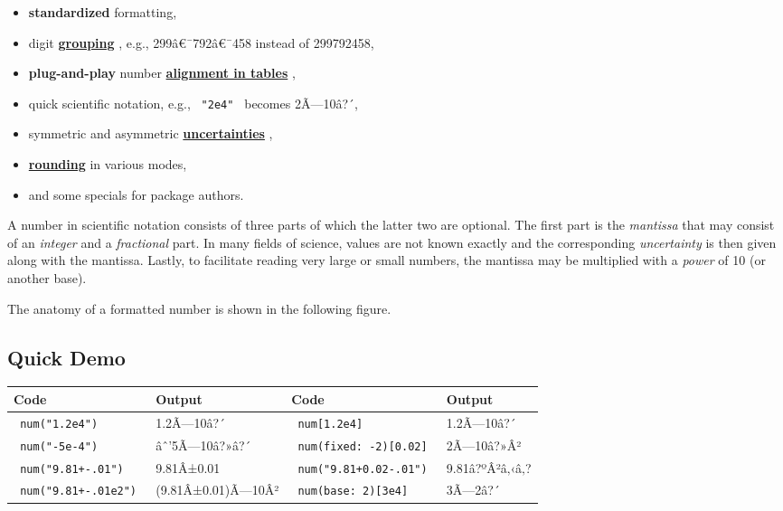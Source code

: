 \begin{itemize}
\tightlist
\item
  \textbf{standardized} formatting,
\item
  digit
  \href{https://github.com/typst/packages/raw/main/packages/preview/zero/0.3.0/\#grouping}{\textbf{grouping}}
  , e.g., 299â€¯792â€¯458 instead of 299792458,
\item
  \textbf{plug-and-play} number
  \href{https://github.com/typst/packages/raw/main/packages/preview/zero/0.3.0/\#table-alignment}{\textbf{alignment
  in tables}} ,
\item
  quick scientific notation, e.g., \texttt{\ "2e4"\ } becomes
  2Ã---10â?´,
\item
  symmetric and asymmetric
  \href{https://github.com/typst/packages/raw/main/packages/preview/zero/0.3.0/\#specifying-uncertainties}{\textbf{uncertainties}}
  ,
\item
  \href{https://github.com/typst/packages/raw/main/packages/preview/zero/0.3.0/\#rounding}{\textbf{rounding}}
  in various modes,
\item
  and some specials for package authors.
\end{itemize}

A number in scientific notation consists of three parts of which the
latter two are optional. The first part is the \emph{mantissa} that may
consist of an \emph{integer} and a \emph{fractional} part. In many
fields of science, values are not known exactly and the corresponding
\emph{uncertainty} is then given along with the mantissa. Lastly, to
facilitate reading very large or small numbers, the mantissa may be
multiplied with a \emph{power} of 10 (or another base).

The anatomy of a formatted number is shown in the following figure.


\subsection{Quick Demo}\label{quick-demo}

\begin{longtable}[]{@{}llll@{}}
\toprule\noalign{}
Code & Output & Code & Output \\
\midrule\noalign{}
\endhead
\bottomrule\noalign{}
\endlastfoot
\texttt{\ num("1.2e4")\ } & 1.2Ã---10â?´ & \texttt{\ num{[}1.2e4{]}\ } &
1.2Ã---10â?´ \\
\texttt{\ num("-5e-4")\ } & âˆ'5Ã---10â?»â?´ &
\texttt{\ num(fixed:\ -2){[}0.02{]}\ } & 2Ã---10â?»Â² \\
\texttt{\ num("9.81+-.01")\ } & 9.81Â±0.01 &
\texttt{\ num("9.81+0.02-.01")\ } & 9.81â?ºÂ²â‚‹â‚? \\
\texttt{\ num("9.81+-.01e2")\ } & (9.81Â±0.01)Ã---10Â² &
\texttt{\ num(base:\ 2){[}3e4{]}\ } & 3Ã---2â?´ \\
\end{longtable}

